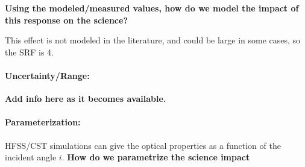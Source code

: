 \textbf{Using the modeled/measured values, how do we model the impact of this response on the science?}

This effect is not modeled in the literature, and could be large in some cases, so the SRF is 4.

\paragraph{Uncertainty/Range:}
\textbf{Add info here as it becomes available.}

\paragraph{Parameterization:}
HFSS/CST simulations can give the optical properties as a function of the incident angle $i$. \textbf{How do we parametrize the science impact}
